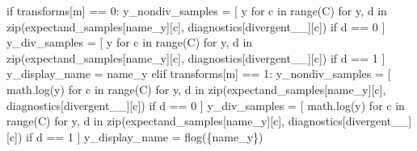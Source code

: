 \documentclass[
  letterpaper,
  DIV=11,
  numbers=noendperiod]{scrartcl}
\newenvironment{Shaded}{\begin{snugshade}}{\end{snugshade}}
\newcommand{\BuiltInTok}[1]{\textcolor[rgb]{0.00,0.23,0.31}{#1}}
\newcommand{\ControlFlowTok}[1]{\textcolor[rgb]{0.00,0.23,0.31}{#1}}
\newcommand{\DecValTok}[1]{\textcolor[rgb]{0.68,0.00,0.00}{#1}}
\newcommand{\KeywordTok}[1]{\textcolor[rgb]{0.00,0.23,0.31}{#1}}
\newcommand{\NormalTok}[1]{\textcolor[rgb]{0.00,0.23,0.31}{#1}}
\newcommand{\OperatorTok}[1]{\textcolor[rgb]{0.37,0.37,0.37}{#1}}
\newcommand{\SpecialCharTok}[1]{\textcolor[rgb]{0.37,0.37,0.37}{#1}}
\newcommand{\SpecialStringTok}[1]{\textcolor[rgb]{0.13,0.47,0.30}{#1}}
\newcommand{\StringTok}[1]{\textcolor[rgb]{0.13,0.47,0.30}{#1}}
\begin{document}
\begin{Shaded}
\begin{Highlighting}[]
      \ControlFlowTok{if}\NormalTok{ transforms[m] }\OperatorTok{==} \DecValTok{0}\NormalTok{:}
\NormalTok{        y\_nondiv\_samples }\OperatorTok{=}\NormalTok{ [ y }\ControlFlowTok{for}\NormalTok{ c }\KeywordTok{in} \BuiltInTok{range}\NormalTok{(C) }\ControlFlowTok{for}\NormalTok{ y, d }\KeywordTok{in} 
                             \BuiltInTok{zip}\NormalTok{(expectand\_samples[name\_y][c], }
\NormalTok{                                 diagnostics[}\StringTok{\textquotesingle{}divergent\_\_\textquotesingle{}}\NormalTok{][c]) }
                             \ControlFlowTok{if}\NormalTok{ d }\OperatorTok{==} \DecValTok{0}\NormalTok{  ]}
\NormalTok{        y\_div\_samples }\OperatorTok{=}\NormalTok{ [ y }\ControlFlowTok{for}\NormalTok{ c }\KeywordTok{in} \BuiltInTok{range}\NormalTok{(C) }\ControlFlowTok{for}\NormalTok{ y, d }\KeywordTok{in} 
                          \BuiltInTok{zip}\NormalTok{(expectand\_samples[name\_y][c], }
\NormalTok{                              diagnostics[}\StringTok{\textquotesingle{}divergent\_\_\textquotesingle{}}\NormalTok{][c]) }
                          \ControlFlowTok{if}\NormalTok{ d }\OperatorTok{==} \DecValTok{1}\NormalTok{  ]}
\NormalTok{        y\_display\_name }\OperatorTok{=}\NormalTok{ name\_y}
      \ControlFlowTok{elif}\NormalTok{ transforms[m] }\OperatorTok{==} \DecValTok{1}\NormalTok{:}
\NormalTok{        y\_nondiv\_samples }\OperatorTok{=}\NormalTok{ [ math.log(y) }\ControlFlowTok{for}\NormalTok{ c }\KeywordTok{in} \BuiltInTok{range}\NormalTok{(C) }\ControlFlowTok{for}\NormalTok{ y, d }\KeywordTok{in} 
                             \BuiltInTok{zip}\NormalTok{(expectand\_samples[name\_y][c], }
\NormalTok{                                 diagnostics[}\StringTok{\textquotesingle{}divergent\_\_\textquotesingle{}}\NormalTok{][c]) }
                             \ControlFlowTok{if}\NormalTok{ d }\OperatorTok{==} \DecValTok{0}\NormalTok{  ]}
\NormalTok{        y\_div\_samples }\OperatorTok{=}\NormalTok{ [ math.log(y) }\ControlFlowTok{for}\NormalTok{ c }\KeywordTok{in} \BuiltInTok{range}\NormalTok{(C) }\ControlFlowTok{for}\NormalTok{ y, d }\KeywordTok{in} 
                          \BuiltInTok{zip}\NormalTok{(expectand\_samples[name\_y][c], }
\NormalTok{                              diagnostics[}\StringTok{\textquotesingle{}divergent\_\_\textquotesingle{}}\NormalTok{][c]) }
                          \ControlFlowTok{if}\NormalTok{ d }\OperatorTok{==} \DecValTok{1}\NormalTok{  ]}
\NormalTok{        y\_display\_name }\OperatorTok{=} \SpecialStringTok{f\textquotesingle{}log(}\SpecialCharTok{\{}\NormalTok{name\_y}\SpecialCharTok{\}}\SpecialStringTok{)\textquotesingle{}}

\end{Highlighting}
\end{Shaded}
\end{document}
